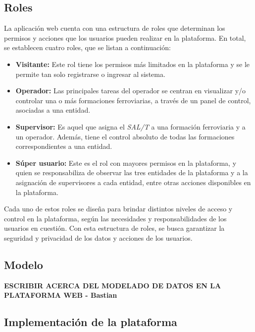 \newpage
\subsection{Roles}

La aplicación web cuenta con una estructura de roles que determinan los permisos y acciones que los usuarios pueden realizar en la plataforma. En total, se establecen cuatro roles, que se listan a continuación:

\begin{itemize}

  \item \textbf{Visitante:} Este rol tiene los permisos más limitados en la plataforma y se le permite tan solo registrarse o ingresar al sistema.

  \item \textbf{Operador:} Las principales tareas del operador se centran en visualizar y/o controlar una o más formaciones ferroviarias, a través de un panel de control, asociadas a una entidad.

  \item \textbf{Supervisor:} Es aquel que asigna el \textit{SAL/T} a una formación ferroviaria y a un operador. Además, tiene el control absoluto de todas las formaciones correspondientes a una entidad.

  \item \textbf{Súper usuario:} Este es el rol con mayores permisos en la plataforma, y quien se responsabiliza de observar las tres entidades de la plataforma y a la asignación de supervisores a cada entidad, entre otras acciones disponibles en la plataforma.

\end{itemize}

Cada uno de estos roles se diseña para brindar distintos niveles de acceso y control en la plataforma, según las necesidades y responsabilidades de los usuarios en cuestión. Con esta estructura de roles, se busca garantizar la seguridad y privacidad de los datos y acciones de los usuarios.


\subsection{Modelo}


\textbf{ESCRIBIR ACERCA DEL MODELADO DE DATOS EN LA PLATAFORMA WEB - Bastian}


\subsection{Implementación de la plataforma}


